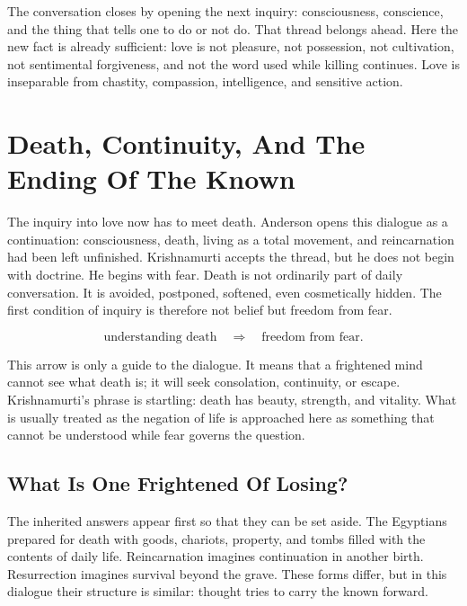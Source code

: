\documentclass[11pt,oneside]{book}
\begin{document}
The conversation closes by opening the next inquiry: consciousness, conscience, and the thing that tells one to do or not do. That thread belongs ahead. Here the new fact is already sufficient: love is not pleasure, not possession, not cultivation, not sentimental forgiveness, and not the word used while killing continues. Love is inseparable from chastity, compassion, intelligence, and sensitive action.


\chapter{Death, Continuity, And The Ending Of The Known}

The inquiry into love now has to meet death. Anderson opens this dialogue as a continuation: consciousness, death, living as a total movement, and reincarnation had been left unfinished. Krishnamurti accepts the thread, but he does not begin with doctrine. He begins with fear. Death is not ordinarily part of daily conversation. It is avoided, postponed, softened, even cosmetically hidden. The first condition of inquiry is therefore not belief but freedom from fear.

\begin{equation}
\text{understanding death}
\quad\Longrightarrow\quad
\text{freedom from fear}.
\end{equation}

This arrow is only a guide to the dialogue. It means that a frightened mind cannot see what death is; it will seek consolation, continuity, or escape. Krishnamurti's phrase is startling: death has beauty, strength, and vitality. What is usually treated as the negation of life is approached here as something that cannot be understood while fear governs the question.

\section{What Is One Frightened Of Losing?}

The inherited answers appear first so that they can be set aside. The Egyptians prepared for death with goods, chariots, property, and tombs filled with the contents of daily life. Reincarnation imagines continuation in another birth. Resurrection imagines survival beyond the grave. These forms differ, but in this dialogue their structure is similar: thought tries to carry the known forward.
\end{document}

